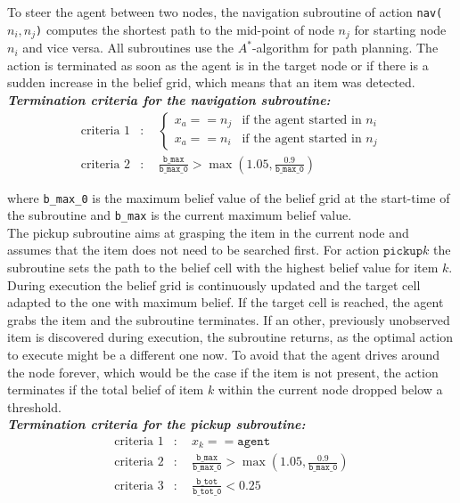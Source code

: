 To steer the agent between two nodes, the navigation subroutine of action \texttt{nav($n_i, n_j$)} computes the shortest path to the mid-point of node $n_j$ for starting node $n_i$ and vice versa. All subroutines use the $A^*$-algorithm for path planning. The action is terminated as soon as the agent is in the target node or if there is a sudden increase in the belief grid, which means that an item was detected.\\
\textit{\textbf{Termination criteria for the navigation subroutine:}}
\begin{align}
    \text{criteria 1}&: \quad
    \begin{cases}x_a == n_j &\text{if the agent started in }n_i\\ 
    x_a == n_i & \text{if the agent started in }n_j \end{cases}\\
    \text{criteria 2}&:\quad \frac{\texttt{b\_max}}{\texttt{b\_max\_0}} > \max\left(1.05, \frac{0.9}{\texttt{b\_max\_0}}\right)
\end{align}

where \texttt{b\_max\_0} is the maximum belief value of the belief grid at the start-time of the subroutine and \texttt{b\_max} is the current maximum belief value.\\

The pickup subroutine aims at grasping the item in the current node and assumes that the item does not need to be searched first. For action $\texttt{pickup}k$ the subroutine sets the path to the belief cell with the highest belief value for item $k$. During execution the belief grid is continuously updated and the target cell adapted to the one with maximum belief. If the target cell is reached, the agent grabs the item and the subroutine terminates. If an other, previously unobserved item is discovered during execution, the subroutine returns, as the optimal action to execute might be a different one now. To avoid that the agent drives around the node forever, which would be the case if the item is not present, the action terminates if the total belief of item $k$ within the current node dropped below a threshold.\\
\textit{\textbf{Termination criteria for the pickup subroutine:}}
\begin{align}
    \text{criteria 1}&: \quad x_k == \texttt{agent}\\
    \text{criteria 2}&: \quad \frac{\texttt{b\_max}}{\texttt{b\_max\_0}} > \max\left(1.05, \frac{0.9}{\texttt{b\_max\_0}}\right)\\
    \text{criteria 3}&: \quad \frac{\texttt{b\_tot}}{\texttt{b\_tot\_0}} < 0.25
\end{align}

